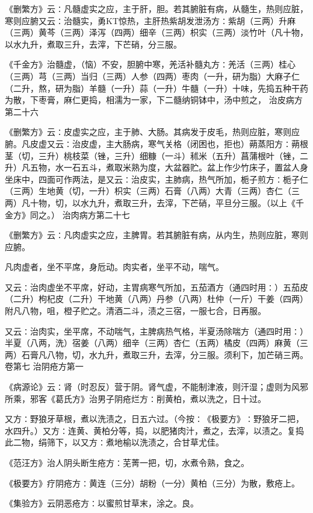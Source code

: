 \documentclass[a4paper,12pt,UTF8,twoside]{ctexbook}
\begin{document}
《删繁方》云∶凡髓虚实之应，主于肝，胆。若其腑脏有病，从髓生，热则应脏，寒则应腑又云∶治髓实，勇KT惊热，主肝热紫胡发泄汤方∶紫胡（三两）升麻（三两）黄芩（三两）泽泻（四两）细辛（三两）枳实（三两）淡竹叶（凡十物，以水九升，煮取三升，去滓，下芒硝，分三服。

《千金方》治髓虚，（恼）不安，胆腑中寒，羌活补髓丸方∶羌活（三两）桂心（三两）芎（三两）当归（三两）人参（四两）枣肉（一升，研为脂）大麻子仁（二升，熬，研为脂）羊髓（一升）蒜（一升）牛髓（一升）十味，先捣五种干药为散，下枣膏，麻仁更捣，相濡为一家，下二髓纳铜钵中，汤中煎之，
治皮病方第二十六

《删繁方》云∶皮虚实之应，主于肺、大肠。其病发于皮毛，热则应脏，寒则应腑。凡皮虚又云∶治皮虚，主大肠病，寒气关格（闭困也，拒也）蒴蒸阳方∶蒴根茎（切，三升）桃枝菜（锉，三升）细糠（一斗）秫米（五升）菖蒲根叶（锉，二升）凡五物，水一石五斗，煮取米熟为度，大盆器贮。盆上作少竹床子，置盆人身坐床中，四面可作两法，是又云∶治皮实，主肺病，热气所加，栀子煎方∶栀子仁（三两）生地黄（切，一升）枳实（三两）石膏（八两）大青（三两）杏仁（三两）凡十物，切，以水九升，煮取三升，去滓，下芒硝，平旦分三服。（以上《千金方》同之。）
治肉病方第二十七

《删繁方》云∶凡肉虚实之应，主脾胃。若其腑脏有病，从内生，热则应脏，寒则应腑。

凡肉虚者，坐不平席，身卮动。肉实者，坐平不动，喘气。

又云∶治肉虚坐不平席，好动，主胃病寒气所加，五茄酒方（通四时用∶）五茄皮（二升）枸杞皮（二升）干地黄（八两）丹参（八两）杜仲（一斤）干姜（四两）附凡八物，咀，橙子贮之。清酒二斗，渍之三宿，一服七合，日再服。

又云∶治肉实，坐平席，不动喘气，主脾病热气格，半夏汤除喘方（通四时用∶）半夏（八两，洗）宿姜（八两）细辛（三两）杏仁（五两）橘皮（四两）麻黄（三两）石膏凡八物，切，水九升，煮取三升，去滓，分三服。须利下，加芒硝三两。
卷第七
治阴疮方第一

《病源论》云∶肾（时忍反）营于阴。肾气虚，不能制津液，则汗湿；虚则为风邪所乘，邪客《葛氏方》治男子阴疮烂方∶削黄柏，煮以洗之，日十过。

又方∶野狼牙草根，煮以洗渍之，日五六过。（今按∶《极要方》∶野狼牙二把，水四升。）又方∶连黄、黄柏分等，捣，以肥猪肉汁，煮之，去滓，以渍之。复捣此二物，绢筛下，以又方∶煮地榆以洗渍之，合甘草尤佳。

《范汪方》治人阴头断生疮方∶芜菁一把，切，水煮令熟，食之。

《极要方》疗阴疮方∶黄连（三分）胡粉（一分）黄柏（三分）为散，敷疮上。

《集验方》云阴恶疮方∶以蜜煎甘草末，涂之。良。
\end{document}
